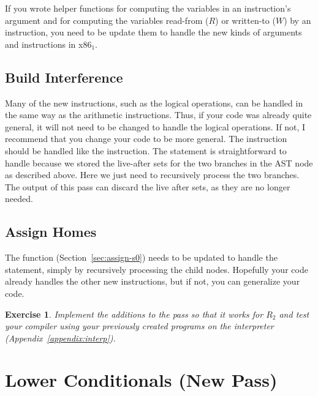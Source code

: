 \documentclass[11pt]{book}
\newtheorem{exercise}[theorem]{Exercise}
\begin{document}
If you wrote helper functions for computing the variables in an
instruction's argument and for computing the variables read-from ($R$)
or written-to ($W$) by an instruction, you need to be update them to
handle the new kinds of arguments and instructions in x86$_1$.

\subsection{Build Interference}
\label{sec:build-interference-r2}

Many of the new instructions, such as the logical operations, can be
handled in the same way as the arithmetic instructions. Thus, if your
code was already quite general, it will not need to be changed to
handle the logical operations. If not, I recommend that you change
your code to be more general. The  instruction should be
handled like the  instruction. The  statement is
straightforward to handle because we stored the live-after sets for
the two branches in the AST node as described above. Here we just need
to recursively process the two branches. The output of this pass can
discard the live after sets, as they are no longer needed.

\subsection{Assign Homes}
\label{sec:assign-homes-r2}

The  function (Section~\ref{sec:assign-s0}) needs
to be updated to handle the  statement, simply by recursively
processing the child nodes.  Hopefully your code already handles the
other new instructions, but if not, you can generalize your code.

\begin{exercise}\normalfont
Implement the additions to the  pass so that
it works for $R_2$ and test your compiler using your previously
created programs on the  interpreter
(Appendix~\ref{appendix:interp}).
\end{exercise}


\section{Lower Conditionals (New Pass)}
\label{sec:lower-conditionals}
\end{document}
